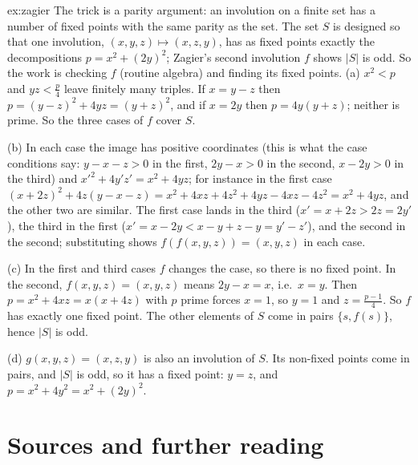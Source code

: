\begin{solution}{ex:zagier}
\idea The trick is a parity argument: an involution on a finite set has a number of fixed points with the same parity as the set. The set $S$ is designed so that one involution, $(x,y,z)\mapsto(x,z,y)$, has as fixed points exactly the decompositions $p=x^2+(2y)^2$; Zagier's second involution $f$ shows $|S|$ is odd. So the work is checking $f$ (routine algebra) and finding its fixed points.
\writeup (a) $x^2<p$ and $yz<\frac p4$ leave finitely many triples. If $x=y-z$ then $p=(y-z)^2+4yz=(y+z)^2$, and if $x=2y$ then $p=4y(y+z)$; neither is prime. So the three cases of $f$ cover $S$.

(b) In each case the image has positive coordinates (this is what the case conditions say: $y-x-z>0$ in the first, $2y-x>0$ in the second, $x-2y>0$ in the third) and $x'^2+4y'z'=x^2+4yz$; for instance in the first case $(x+2z)^2+4z(y-x-z)=x^2+4xz+4z^2+4yz-4xz-4z^2=x^2+4yz$, and the other two are similar. The first case lands in the third ($x'=x+2z>2z=2y'$), the third in the first ($x'=x-2y<x-y+z-y=y'-z'$), and the second in the second; substituting shows $f(f(x,y,z))=(x,y,z)$ in each case.

(c) In the first and third cases $f$ changes the case, so there is no fixed point. In the second, $f(x,y,z)=(x,y,z)$ means $2y-x=x$, i.e.\ $x=y$. Then $p=x^2+4xz=x(x+4z)$ with $p$ prime forces $x=1$, so $y=1$ and $z=\frac{p-1}4$. So $f$ has exactly one fixed point. The other elements of $S$ come in pairs $\{s,f(s)\}$, hence $|S|$ is odd.

(d) $g(x,y,z)=(x,z,y)$ is also an involution of $S$. Its non-fixed points come in pairs, and $|S|$ is odd, so it has a fixed point: $y=z$, and $p=x^2+4y^2=x^2+(2y)^2$.
\end{solution}

\section*{Sources and further reading}

